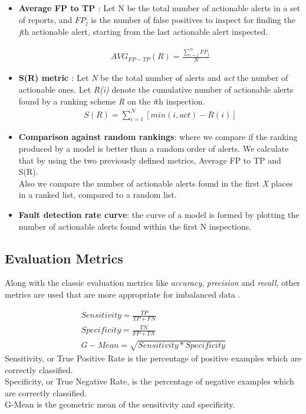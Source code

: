 \begin{itemize}
	\item \textbf{Average FP to TP \cite{correlation_exploitation}}: Let N be the total number of actionable alerts in a set of reports, and $FP_j$ is the number of false positives to inspect for finding the \textit{j}th actionable alert, starting from the last actionable alert inspected.
	
	\begin{gather*}
	AVG_{FP-TP}(R) = \frac{\sum_{i=1}^{N} FP_j}{N}
	\end{gather*}
	
	\item \textbf{S(R) metric \cite{z-ranking}}: Let \textit{N} be
	the total number of alerts and \textit{act} the number of actionable ones. Let \textit{R(i)} denote the cumulative number of actionable alerts found by a ranking scheme \textit{R} on the \textit{i}th inspection. \\
	\begin{gather*}
	S(R) = \sum_{i=1}^{N} [min(i,act) - R(i)]
	\end{gather*}
	\item \textbf{Comparison against random rankings}: where we compare if the ranking produced by a model is better than a random order of alerts. We calculate that by using the two previously defined metrics, Average FP to TP and S(R).\\
	Also we compare the number of actionable alerts found in the first \textit{X} places in a ranked list, compared to a random list.
	\item \textbf{Fault detection rate curve}: the curve of a model is formed by plotting the number of actionable alerts found within the first N inspections.
	
\end{itemize}

\subsection{Evaluation Metrics}

Along with the classic evaluation metrics like \textit{accuracy}, \textit{precision} and \textit{recall}, other metrics are used that are more appropriate for imbalanced data \cite{comparison_metrics, iba_metric}. 


\begin{gather*}
Sensitivity = \frac{TP}{TP + FN}\\
Specificity = \frac{TN}{FP + TN}\\
G-Mean = \sqrt{Sensitivity * Specificity}
\end{gather*} 
Sensitivity, or True Positive Rate is the percentage of positive examples which
are correctly classified.\\
Specificity, or True Negative Rate, is the percentage of negative examples which are correctly classified.\\
G-Mean is the geometric mean of the sensitivity and specificity.


